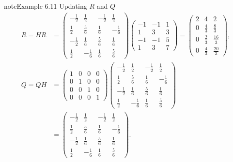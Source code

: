 \documentclass[letterpaper,10pt,english]{jupyterBook}
\begin{document}
\begin{sphinxadmonition}{note}{Example 6.11}
\sphinxAtStartPar
Updating \(R\) and \(Q\)
\begin{align*}
    R = H R &= \left(\begin{matrix}- \frac{1}{2} & \frac{1}{2} & - \frac{1}{2} & \frac{1}{2}\\\frac{1}{2} & \frac{5}{6} & \frac{1}{6} & - \frac{1}{6}\\- \frac{1}{2} & \frac{1}{6} & \frac{5}{6} & \frac{1}{6}\\\frac{1}{2} & - \frac{1}{6} & \frac{1}{6} & \frac{5}{6}\end{matrix}\right)\left(\begin{matrix}-1 & -1 & 1\\1 & 3 & 3\\-1 & -1 & 5\\1 & 3 & 7\end{matrix}\right) = \left(\begin{matrix}2 & 4 & 2\\0 & \frac{4}{3} & \frac{8}{3}\\0 & \frac{2}{3} & \frac{16}{3}\\0 & \frac{4}{3} & \frac{20}{3}\end{matrix}\right), \\
    Q = Q H &= \left(\begin{matrix}1 & 0 & 0 & 0\\0 & 1 & 0 & 0\\0 & 0 & 1 & 0\\0 & 0 & 0 & 1\end{matrix}\right)\left(\begin{matrix}- \frac{1}{2} & \frac{1}{2} & - \frac{1}{2} & \frac{1}{2}\\\frac{1}{2} & \frac{5}{6} & \frac{1}{6} & - \frac{1}{6}\\- \frac{1}{2} & \frac{1}{6} & \frac{5}{6} & \frac{1}{6}\\\frac{1}{2} & - \frac{1}{6} & \frac{1}{6} & \frac{5}{6}\end{matrix}\right) \\
    & = \left(\begin{matrix}- \frac{1}{2} & \frac{1}{2} & - \frac{1}{2} & \frac{1}{2}\\\frac{1}{2} & \frac{5}{6} & \frac{1}{6} & - \frac{1}{6}\\- \frac{1}{2} & \frac{1}{6} & \frac{5}{6} & \frac{1}{6}\\\frac{1}{2} & - \frac{1}{6} & \frac{1}{6} & \frac{5}{6}\end{matrix}\right).
\end{align*}

\end{sphinxadmonition}
\end{document}
